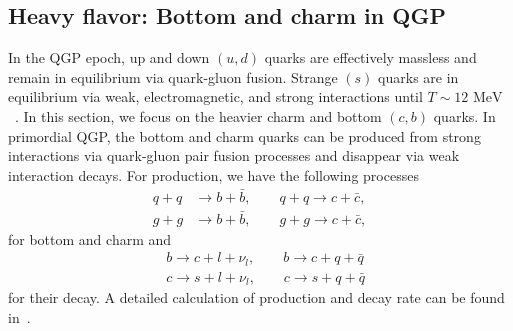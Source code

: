 \documentclass[universe,article,submit,moreauthors,pdftex,a4paper]{Definitions/mdpi}
\newcommand{\MeV}{\text{ MeV}}
\begin{document}
\subsection{Heavy flavor: Bottom and charm in QGP}\label{sec:BottomCharm}
\noindent In the QGP epoch, up and down $(u,d)$ quarks are effectively massless and remain in equilibrium via quark-gluon fusion. Strange $(s)$ quarks are in equilibrium via weak, electromagnetic, and strong interactions until $T\sim12\MeV$~\cite{Yang:2021bko}. In this section, we focus on the heavier charm and bottom $(c,b)$ quarks. In primordial QGP, the bottom and charm quarks can be produced from strong interactions via quark-gluon pair fusion processes and disappear via weak interaction decays. For production, we have the following processes
\begin{align}
 q+q&\longrightarrow b+\bar b,\qquad q+q\longrightarrow c+\bar c,\\
 g+g&\longrightarrow b+\bar b,\qquad g+g\longrightarrow c+\bar c,
\end{align}
for bottom and charm and 
\begin{align}
 &b\longrightarrow c+l+\nu_l, \qquad b\longrightarrow c+q+\bar{q}\\
&c\longrightarrow s+l+\nu_l,\qquad c\longrightarrow s+q+\bar{q}
\end{align}
for their decay. A detailed calculation of production and decay rate can be found in~\cite{Yang:2020nne,Yang:2023bot}.
\end{document}

